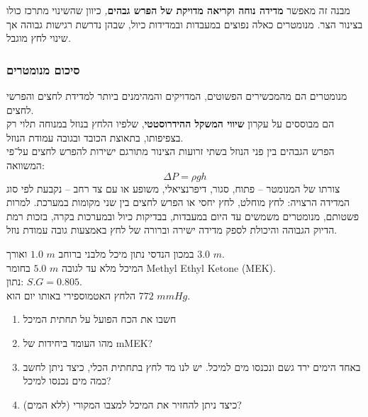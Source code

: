 \documentclass[
  hebrew,
  letterpaper,
  DIV=11,
  numbers=noendperiod]{scrreprt}
\providecommand{\tightlist}{%
  \setlength{\itemsep}{0pt}\setlength{\parskip}{0pt}}
\begin{document}
{מבנה זה מאפשר \textbf{מדידה נוחה וקריאה מדויקת של הפרש גבהים}}\emph{,}
{כיוון שהשינוי מתרכז כולו בצינור הצר}\emph{.} {מנומטרים כאלה נפוצים
במעבדות ובמדידות כיול, שבהן נדרשת רגישות גבוהה אך שינוי לחץ
מוגבל}\emph{.}

\subsubsection{\texorpdfstring{{סיכום
מנומטרים}}{סיכום מנומטרים}}\label{ux5e1ux5d9ux5dbux5d5ux5dd-ux5deux5e0ux5d5ux5deux5d8ux5e8ux5d9ux5dd}

{מנומטרים הם מהמכשירים הפשוטים, המדויקים והמהימנים ביותר למדידת לחצים
והפרשי לחצים}.\\
{הם מבוססים על עקרון \textbf{שיווי המשקל ההידרוסטטי}}, {שלפיו הלחץ בנוזל
במנוחה תלוי רק בצפיפותו, בתאוצת הכובד ובגובה עמודת הנוזל}.\\
{הפרש הגבהים בין פני הנוזל בשתי זרועות הצינור מתורגם ישירות להפרש לחצים
על־פי המשוואה}: \[\Delta P = \rho gh\] {צורתו של המנומטר -- פתוח, סגור,
דיפרנציאלי, משופע או עם צד רחב -- נקבעת לפי סוג המדידה הרצויה: לחץ
מוחלט, לחץ יחסי או הפרש לחצים בין שני מקומות במערכת}. {למרות פשטותם,
מנומטרים משמשים עד היום במעבדות, בבדיקות כיול ובמערכות בקרה, בזכות רמת
הדיוק הגבוהה והיכולת לספק מדידה ישירה וברורה של לחץ באמצעות גובה עמודת
נוזל}.

{במכון הנדסי נתון מיכל מלבני ברוחב} \(1.0\text{~}m\) {ואורך}
\(3.0\text{~}m\){.}\\
{המיכל מלא עד לגובה} \(5.0\text{~}m\) {בחומר} Methyl Ethyl Ketone
(MEK){.}\\
{נתון:} \(S.G = 0.805\){.\\
הלחץ האטמוספירי באותו יום הוא} \(772\text{~}mmHg\){.}

\begin{enumerate}
\def\labelenumi{\arabic{enumi}.}
\tightlist
\item
  חשבו את הכח הפועל על תחתית המיכל\\
\item
  מהו העומד ביחידות של mMEK?\\
\item
  באחד הימים ירד גשם ונכנסו מים למיכל. יש לנו מד לחץ בתחתית הכלי, כיצד
  ניתן לחשב כמה מים נכנסו למיכל?\\
\item
  כיצד ניתן להחזיר את המיכל למצבו המקורי (ללא המים)?
\end{enumerate}
\end{document}
